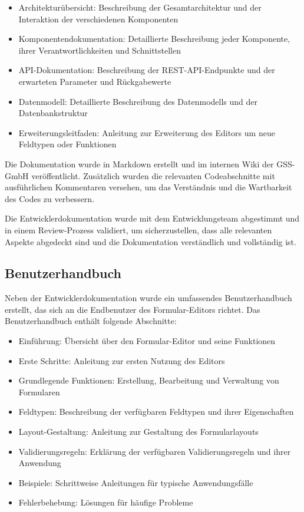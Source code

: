 \documentclass[a4paper,11pt]{article}
\begin{document}
\begin{itemize}
  \item Architekturübersicht: Beschreibung der Gesamtarchitektur und der Interaktion der verschiedenen Komponenten
  \item Komponentendokumentation: Detaillierte Beschreibung jeder Komponente, ihrer Verantwortlichkeiten und Schnittstellen
  \item API-Dokumentation: Beschreibung der REST-API-Endpunkte und der erwarteten Parameter und Rückgabewerte
  \item Datenmodell: Detaillierte Beschreibung des Datenmodells und der Datenbankstruktur
  \item Erweiterungsleitfaden: Anleitung zur Erweiterung des Editors um neue Feldtypen oder Funktionen
\end{itemize}

Die Dokumentation wurde in Markdown erstellt und im internen Wiki der GSS-GmbH veröffentlicht. Zusätzlich wurden die relevanten Codeabschnitte mit ausführlichen Kommentaren versehen, um das Verständnis und die Wartbarkeit des Codes zu verbessern.

Die Entwicklerdokumentation wurde mit dem Entwicklungsteam abgestimmt und in einem Review-Prozess validiert, um sicherzustellen, dass alle relevanten Aspekte abgedeckt sind und die Dokumentation verständlich und vollständig ist.

\subsection{Benutzerhandbuch}
Neben der Entwicklerdokumentation wurde ein umfassendes Benutzerhandbuch erstellt, das sich an die Endbenutzer des Formular-Editors richtet. Das Benutzerhandbuch enthält folgende Abschnitte:

\begin{itemize}
  \item Einführung: Übersicht über den Formular-Editor und seine Funktionen
  \item Erste Schritte: Anleitung zur ersten Nutzung des Editors
  \item Grundlegende Funktionen: Erstellung, Bearbeitung und Verwaltung von Formularen
  \item Feldtypen: Beschreibung der verfügbaren Feldtypen und ihrer Eigenschaften
  \item Layout-Gestaltung: Anleitung zur Gestaltung des Formularlayouts
  \item Validierungsregeln: Erklärung der verfügbaren Validierungsregeln und ihrer Anwendung
  \item Beispiele: Schrittweise Anleitungen für typische Anwendungsfälle
  \item Fehlerbehebung: Lösungen für häufige Probleme
\end{itemize}
\end{document}
